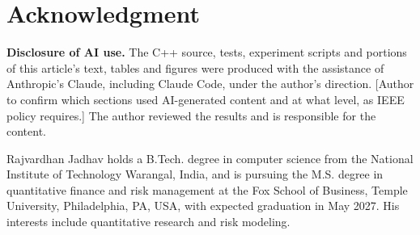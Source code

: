 \documentclass{ieeeaccess}
\begin{document}
\section*{Acknowledgment}
\textbf{Disclosure of AI use.} The C++ source, tests, experiment scripts and portions of this article's text, tables and figures were produced with the assistance of Anthropic's Claude, including Claude Code, under the author's direction. [Author to confirm which sections used AI-generated content and at what level, as IEEE policy requires.] The author reviewed the results and is responsible for the content.




\begin{IEEEbiographynophoto}{Rajvardhan Jadhav}
holds a B.Tech. degree in computer science from the National Institute of Technology Warangal, India, and is pursuing the M.S. degree in quantitative finance and risk management at the Fox School of Business, Temple University, Philadelphia, PA, USA, with expected graduation in May 2027. His interests include quantitative research and risk modeling.
\end{IEEEbiographynophoto}

\EOD
\end{document}
